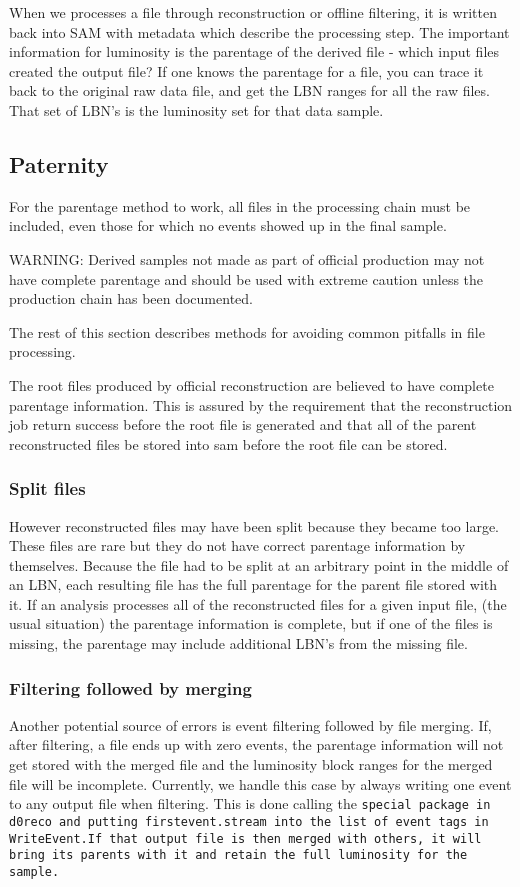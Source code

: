 \documentclass[12pt]{article}
\begin{document}
When we processes a file through reconstruction or offline filtering, it is written
back into SAM with metadata which describe the processing step.  The important information
for luminosity is the parentage of the derived file - which input files created the
output file?  If one knows the parentage for a file, you can trace it back to the
original raw data file, and get the LBN ranges for all the raw files.  That
set of LBN's is the luminosity set for that data sample.

\subsection{Paternity}

For the parentage method to work, all files in the processing chain must be
included, even those for which no events showed up in the final sample.

WARNING: Derived samples not made as part of official production may not
have complete parentage and should be used with extreme caution unless the
production chain has been documented.

The rest of this section describes methods for avoiding common pitfalls in
file processing.


The root files produced by official reconstruction are believed to
have complete parentage information.  This is assured by the requirement
that the reconstruction job return success before the root file
is generated and that  all of the parent reconstructed files be stored into sam before the
root file can be stored.

\subsubsection{Split files}
However reconstructed files may have
been split because they became too large. These files are rare but they
do not have correct parentage information by themselves.
Because the file had to be split at an arbitrary point in the middle of
an LBN, each resulting file has the full parentage for the parent file
stored with it.  If an analysis processes all of the reconstructed files for a given
input file, (the usual situation) the parentage information is complete, but if one of the
files is missing, the parentage may include additional LBN's from
the missing file.

\subsubsection{Filtering followed by merging}
Another potential source of errors is event filtering followed by file merging.  If, after
filtering, a file ends up with zero events, the parentage information will not
get stored with the merged file and the luminosity block ranges for the merged file
will be incomplete.
Currently, we handle this case by  always
writing one event to any output file when filtering.  This is done calling the \tt special \rm
package in d0reco and putting \tt firstevent.stream \rm into the
list of event tags in \tt WriteEvent.\rm  If that output file is then merged
with others, it will bring its parents with it and retain the full luminosity
for the sample.
\end{document}
